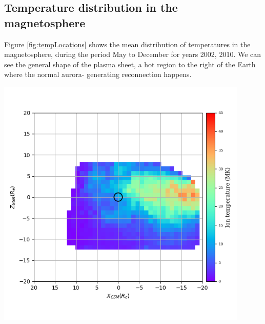 \documentclass[12pt]{article}
\newenvironment{Figure}
  {\par\medskip\noindent\minipage{\linewidth}}
  {\endminipage\par\medskip}
\begin{document}
\subsection{Temperature distribution in the magnetosphere}
Figure \ref{fig:tempLocations} shows the mean distribution of temperatures in the magnetosphere, during the period May to December for years 2002, 2010. We can see the general shape of the plasma sheet, a hot region to the right of the Earth where the normal aurora- generating reconnection happens.

\begin{Figure}
    \begin{minipage}[c]{0.57\textwidth}
        \centering
        \includegraphics[width=0.9\textwidth]{tempLocations.png}
    \end{minipage}\hfill
    \begin{minipage}[c]{0.4\textwidth}
        \label{fig:tempLocations}
    \end{minipage}
\end{Figure}
\end{document}

